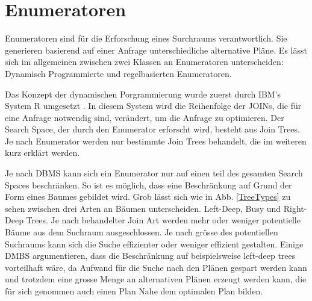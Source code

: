 \section{Enumeratoren}

Enumeratoren sind für die Erforschung eines Surchraums verantwortlich. Sie generieren basierend auf einer Anfrage unterschiedliche alternative Pläne. Es lässt sich im allgemeinen zwischen zwei Klassen an Enumeratoren unterscheiden: Dynamisch Programmierte und regelbasierten Enumeratoren. 

Das Konzept der dynamischen Porgrammierung wurde zuerst durch IBM's System R umgesetzt \cite{selinger1979access}. In diesem System wird die Reihenfolge der JOINs, die für eine Anfrage notwendig sind, verändert, um die Anfrage zu optimieren. Der Search Space, der durch den Enumerator erforscht wird, besteht aus Join Trees. Je nach Enumerator werden nur bestimmte Join Trees behandelt, die im weiteren kurz erklärt werden.

Je nach \ac{DBMS} kann sich ein Enumerator nur auf einen teil des gesamten Search Spaces beschränken. So ist es möglich, dass eine Beschränkung auf Grund der Form eines Baumes gebildet wird. Grob lässt sich wie in Abb. \ref{TreeTypes} zu sehen zwischen drei Arten an Bäumen unterscheiden. Left-Deep, Busy und Right-Deep Trees. Je nach behandelter Join Art werden mehr oder weniger potentielle Bäume aus dem Suchraum ausgeschlossen. Je nach grösse des potentiellen Suchraums kann sich die Suche effizienter oder weniger effizient gestalten. Einige \ac{DMBS} argumentieren, dass die Beschränkung auf beispielsweise left-deep trees vorteilhaft wäre, da Aufwand für die Suche nach den Plänen gespart werden kann und trotzdem eine grosse Menge an alternativen Plänen erzeugt werden kann, die für sich genommen auch einen Plan Nahe dem optimalen Plan bilden. 